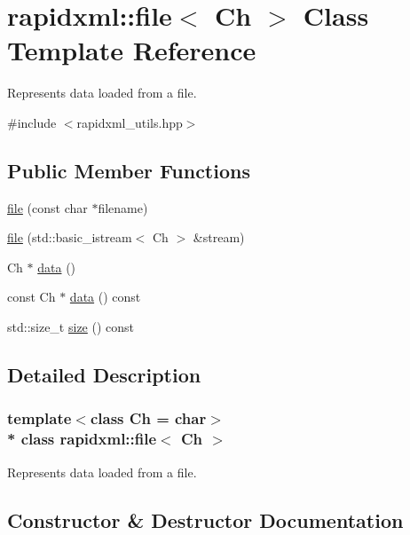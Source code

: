 \hypertarget{classrapidxml_1_1file}{}\section{rapidxml\+:\+:file$<$ Ch $>$ Class Template Reference}
\label{classrapidxml_1_1file}


Represents data loaded from a file.  




{\ttfamily \#include $<$rapidxml\+\_\+utils.\+hpp$>$}

\subsection*{Public Member Functions}
\begin{DoxyCompactItemize}
\item 
\hyperlink{classrapidxml_1_1file_ae881a3cab1fe7152d45c92a8d7606cb3}{file} (const char $\ast$filename)
\item 
\hyperlink{classrapidxml_1_1file_a90707ccd991cc392dcf4bef37eed9d1f}{file} (std\+::basic\+\_\+istream$<$ Ch $>$ \&stream)
\item 
Ch $\ast$ \hyperlink{classrapidxml_1_1file_af1c71d65862c7af14e4708e32a80c1de}{data} ()
\item 
const Ch $\ast$ \hyperlink{classrapidxml_1_1file_aceb8f5ebd577c946a74b1ea3e2e0c576}{data} () const 
\item 
std\+::size\+\_\+t \hyperlink{classrapidxml_1_1file_a20191d167c6e00a88a44ca9a3a54e1c5}{size} () const 
\end{DoxyCompactItemize}


\subsection{Detailed Description}
\subsubsection*{template$<$class Ch = char$>$\\*
class rapidxml\+::file$<$ Ch $>$}

Represents data loaded from a file. 

\subsection{Constructor \& Destructor Documentation}
